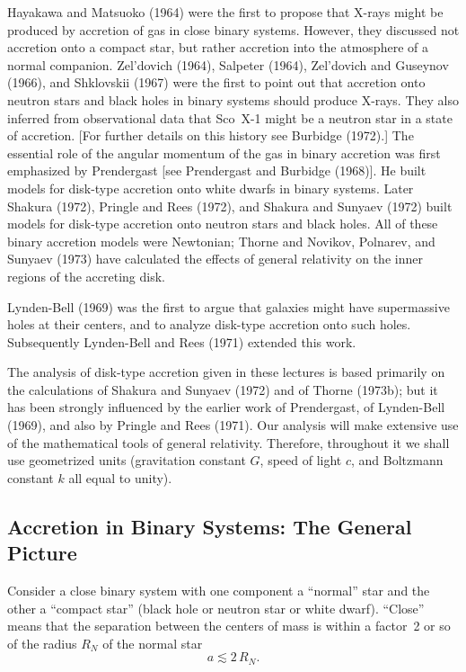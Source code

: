 Hayakawa and Matsuoko (1964) were the first to propose that X-rays might
be produced by accretion of gas in close binary systems.  However, they discussed
not accretion onto a compact star, but rather accretion into the atmosphere
of a normal companion.  Zel'dovich (1964), Salpeter (1964), Zel'dovich and Guseynov
(1966), and Shklovskii (1967) were the first to point out that
accretion onto neutron stars and black holes in binary systems should produce
X-rays.  They also inferred from observational data that Sco~X-1 might be a
neutron star in a state of accretion.  [For further details on this history
see Burbidge (1972).]  The essential role of the angular momentum of the gas in
binary accretion was first emphasized by Prendergast [see Prendergast and
Burbidge (1968)].  He built models for disk-type accretion onto white dwarfs
in binary systems.  Later Shakura (1972), Pringle and Rees (1972), and Shakura
and Sunyaev (1972) built models for disk-type accretion onto neutron stars and
black holes.  All of these binary accretion models were Newtonian; Thorne
and Novikov, Polnarev, and Sunyaev (1973) have calculated the effects
of general relativity on the inner regions of the accreting disk.

Lynden-Bell (1969) was the first to argue that galaxies might have super\-massive holes at their centers, and to analyze disk-type accretion onto such holes.
Subsequently Lynden-Bell and Rees (1971) extended this work.

The analysis of disk-type accretion given in these lectures is based primarily
on the calculations of Shakura and Sunyaev (1972) and of Thorne (1973b); but
it has been strongly influenced by the earlier work of Prendergast, of
Lynden-Bell (1969), and also by Pringle and Rees (1971).  Our analysis will make
extensive use of the mathematical tools of general relativity.  Therefore,
throughout it we shall use geometrized units (gravitation constant $G$, speed
of light $c$, and Boltzmann constant $k$ all equal to unity).

\subsection{Accretion in Binary Systems: The General Picture}
\label{sec:5.2}

Consider a close binary system with one component a ``normal'' star and the
other a ``compact star'' (black hole or neutron star or white dwarf).  ``Close''
means that the separation between the centers of mass is within a factor~2 or
so of the radius $R_N$ of the normal star
\begin{equation}
a \lesssim 2\,R_N. \tag{5.2.1}
\end{equation}

